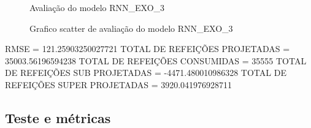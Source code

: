 \documentclass[	12pt, Times, openright, twoside, a4paper, english, brazil]{abntex2}
\begin{document}
                \begin{figure}[!ht]
                  \caption{Avaliação do modelo RNN\_EXO\_3 \label{fig:case1_rnn_exo_3_val} }
                \end{figure}
                \begin{figure}[!ht]
                  \caption{Grafico scatter de avaliação do modelo RNN\_EXO\_3 \label{fig:case1_rnn_exo_3_val_scatter} }
                \end{figure}

                RMSE = 121.25903250027721\newline
                TOTAL DE REFEIÇÕES PROJETADAS = 35003.56196594238\newline
                TOTAL DE REFEIÇÕES CONSUMIDAS = 35555\newline
                TOTAL DE REFEIÇÕES SUB PROJETADAS = -4471.480010986328\newline
                TOTAL DE REFEIÇÕES SUPER PROJETADAS = 3920.041976928711\newline

    	\subsection{Teste e métricas}
\end{document}
